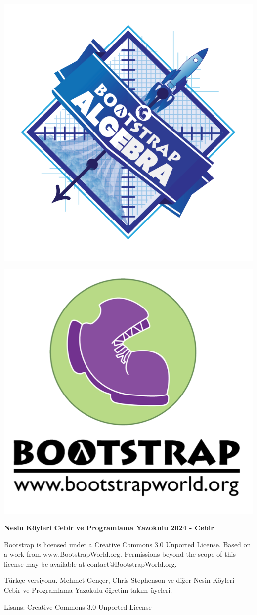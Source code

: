 \documentclass[12pt, a4paper]{article}
\begin{document}
\setcounter{page}{1}
\\
\vspace*{0.8cm}
\begin{center}
\includegraphics[width=0.8\linewidth]{cebirlogo.png}

\includegraphics[width=0.25\linewidth]{bootstrap-logo.png}
 
\end{center}

\vspace*{0.2cm}


\begin{center}
{\Large \bf{Nesin Köyleri Cebir ve Programlama Yazokulu 2024 - Cebir}}

{\tiny Bootstrap is licensed under a Creative Commons 3.0 Unported License. Based on a work from
www.BootstrapWorld.org. Permissions beyond the scope of this license may be available at
contact@BootstrapWorld.org.

Türkçe versiyonu. Mehmet Gençer, Chris Stephenson ve diğer Nesin Köyleri Cebir ve Programlama Yazokulu öğretim takım üyeleri.

Lisans: Creative Commons 3.0 Unported License} 
\end{center}
\end{document}
